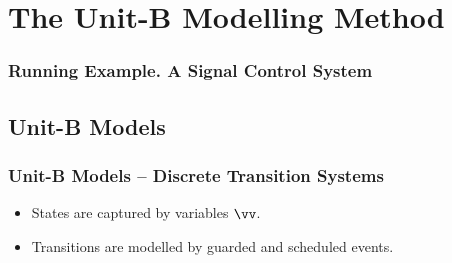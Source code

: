 \section{The Unit-B Modelling Method}
\label{sec:unit-b-modelling}


\newcommand{\iI}{I}
\newcommand{\predP}{P}
\newcommand{\predQ}{Q}
\newcommand{\predR}{R}




\begin{frame}
  \frametitle{Running Example. A Signal Control System}

  \begin{center}
    
  \end{center}
  
  \begin{requirements}
    \ReqSpacing
  \end{requirements}
  
\end{frame}

\subsection{Unit-B Models}
\label{sec:unit-b-models}

\begin{frame}
  \frametitle{Unit-B Models -- Discrete Transition Systems}

  \begin{itemize}
  \item States are captured by \alert{variables $\vv$}.
    \medskip
  \item Transitions are modelled by \alert{guarded and scheduled events}.
  \end{itemize}

\end{frame}

